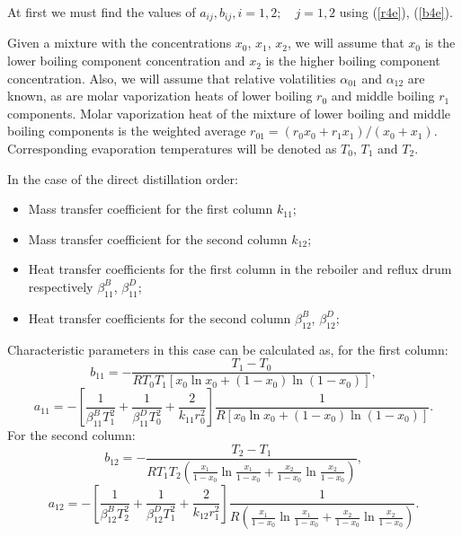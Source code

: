 \documentclass[12pt]{article}
\begin{document}
At first we must find the values of  $a_{ij}, b_{ij},i=1, 2;\quad j=1, 2$ using (\ref{r4e}), (\ref{b4e}).

Given a mixture with the concentrations $x_0$, $x_1$, $x_2$, we will assume that $x_0$ is the lower boiling component concentration and $x_2$ is the higher boiling component concentration. Also, we will assume that relative volatilities $\alpha_{01}$ and $\alpha_{12}$ are known, as are molar vaporization heats of lower boiling $r_0$ and middle boiling $r_1$ components. Molar vaporization heat of the mixture of lower boiling and middle boiling components is the weighted average $r_{01} = (r_0x_0 + r_1x_1)/(x_0+x_1)$. Corresponding evaporation temperatures will be denoted as $T_0$, $T_1$ and $T_2$.

In the case of the direct distillation order:
\begin{itemize}
\item Mass transfer coefficient for the first column $k_{11}$;
\item Mass transfer coefficient for the second column $k_{12}$;
\item Heat transfer coefficients for the first column in the reboiler and reflux drum respectively $\beta^B_{11}$, $\beta^D_{11}$;
\item Heat transfer coefficients for the second column $\beta^B_{12}$, $\beta^D_{12}$;
\end{itemize}

Characteristic parameters in this case can be calculated as, for the first column:
\begin{equation}
b_{11} = -\frac{T_1 - T_0}{RT_0T_1\left[x_0\ln{x_0} + (1-x_0)\ln{(1-x_0)}\right]},
\label{eq:b1c1v}
\end{equation}
\begin{equation}
a_{11} = -\left[\frac{1}{\beta^B_{11}T_1^2} + \frac{1}{\beta^D_{11}T_0^2} + \frac{2}{k_{11}r_0^2}\right]\frac{1}{R\left[x_0\ln{x_0} + (1-x_0)\ln{(1-x_0)}\right]}.
\label{eq:a1c1v}
\end{equation}
For the second column:
\begin{equation}
b_{12} = -\frac{T_2 - T_1}{RT_1T_2(\frac{x_1}{1-x_0}\ln{\frac{x_1}{1-x_0}} + \frac{x_2}{1-x_0}\ln{\frac{x_2}{1-x_0}})},
\label{eq:b2c1v}
\end{equation}
\begin{equation}
a_{12} = -\left[\frac{1}{\beta^B_{12}T_2^2} + \frac{1}{\beta^D_{12}T_1^2} + \frac{2}{k_{12}r_1^2}\right]\frac{1}{R(\frac{x_1}{1-x_0}\ln{\frac{x_1}{1-x_0}} + \frac{x_2}{1-x_0}\ln{\frac{x_2}{1-x_0}})}.
\label{eq:a2c1v}
\end{equation}
\end{document}
